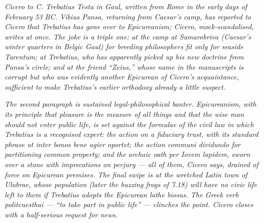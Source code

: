 
\textit{Cicero to C. Trebatius Testa in Gaul, written from Rome in
the early days of February 53 BC. Vibius Pansa, returning from
Caesar's camp, has reported to Cicero that Trebatius has gone over
to Epicureanism; Cicero, mock-scandalised, writes at once. The
joke is a triple one: at the camp at Samarobriva (Caesar's winter
quarters in Belgic Gaul) for breeding philosophers fit only for
seaside Tarentum; at Trebatius, who has apparently picked up his
new doctrine from Pansa's circle; and at the friend ``Zeius,''
whose name in the manuscripts is corrupt but who was evidently
another Epicurean of Cicero's acquaintance, sufficient to make
Trebatius's earlier orthodoxy already a little suspect.}

\textit{The second paragraph is sustained legal-philosophical
banter. Epicureanism, with its principle that pleasure is the
measure of all things and that the wise man should not enter
public life, is set against the formulae of the civil law in
which Trebatius is a recognised expert: the action on a
fiduciary trust, with its standard phrase \textit{ut inter bonos
bene agier oportet}; the action \textit{communi dividundo} for
partitioning common property; and the archaic oath \textit{per
Iovem lapidem}, sworn over a stone with imprecations on perjury
--- all of them, Cicero says, drained of force on Epicurean
premises. The final swipe is at the wretched Latin town of
Ulubrae, whose population (later the buzzing frogs of 7.18)
will have no civic life left to them if Trebatius adopts the
Epicurean \textit{lathe biosas}. The Greek verb
\textit{politeuesthai} --- ``to take part in public life'' ---
clinches the point. Cicero closes with a half-serious request
for news.}
